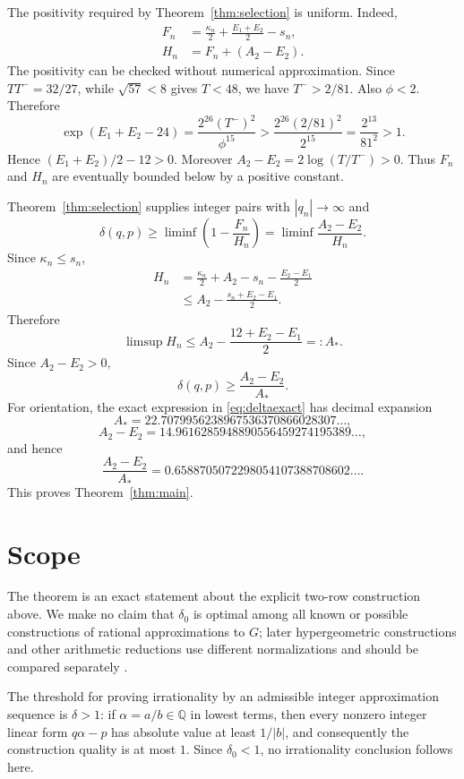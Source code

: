 \documentclass[11pt]{article}
\theoremstyle{definition}
\theoremstyle{remark}
\newcommand{\Q}{\mathbb Q}
\begin{document}
The positivity required by Theorem~\ref{thm:selection} is uniform.  Indeed,
\begin{align}
F_n&=\frac{\kappa_n}{2}+\frac{E_1+E_2}{2}-s_n,
\label{eq:Fexplicit}\\
H_n&=F_n+(A_2-E_2).
\label{eq:Hexplicit}
\end{align}
The positivity can be checked without numerical approximation.  Since $TT^-=32/27$, while $\sqrt{57}<8$ gives $T<48$, we have $T^->2/81$.  Also $\phi<2$.  Therefore
\[
\exp(E_1+E_2-24)
=\frac{2^{26}(T^-)^2}{\phi^{15}}
>\frac{2^{26}(2/81)^2}{2^{15}}
=\frac{2^{13}}{81^2}>1.
\]
Hence $(E_1+E_2)/2-12>0$.  Moreover $A_2-E_2=2\log(T/T^-)>0$.  Thus $F_n$ and $H_n$ are eventually bounded below by a positive constant.

Theorem~\ref{thm:selection} supplies integer pairs with $|q_n|\to\infty$ and
\[
\delta(q,p)
\ge \liminf\left(1-\frac{F_n}{H_n}\right)
=\liminf\frac{A_2-E_2}{H_n}.
\]
Since $\kappa_n\le s_n$,
\begin{align*}
H_n
&=\frac{\kappa_n}{2}+A_2-s_n-\frac{E_2-E_1}{2}\\
&\le A_2-\frac{s_n+E_2-E_1}{2}.
\end{align*}
Therefore
\[
\limsup H_n\le
A_2-\frac{12+E_2-E_1}{2}=:A_*.
\]
Since $A_2-E_2>0$,
\begin{equation}\label{eq:deltaexact}
\delta(q,p)\ge\frac{A_2-E_2}{A_*}.
\end{equation}
For orientation, the exact expression in \eqref{eq:deltaexact} has decimal expansion
\[
A_*=22.7079956238967536370866028307\ldots,
\]
\[
A_2-E_2=14.9616285948890556459274195389\ldots,
\]
and hence
\[
\frac{A_2-E_2}{A_*}
=0.6588705072298054107388708602\ldots.
\]
This proves Theorem~\ref{thm:main}.

\section{Scope}
The theorem is an exact statement about the explicit two-row construction above.  We make no claim that $\delta_0$ is optimal among all known or possible constructions of rational approximations to $G$; later hypergeometric constructions and other arithmetic reductions use different normalizations and should be compared separately \cite{KrattenthalerZudilin2019,Zudilin2019}.

The threshold for proving irrationality by an admissible integer approximation sequence is $\delta>1$: if $\alpha=a/b\in\Q$ in lowest terms, then every nonzero integer linear form $q\alpha-p$ has absolute value at least $1/|b|$, and consequently the construction quality is at most $1$.  Since $\delta_0<1$, no irrationality conclusion follows here.
\end{document}
